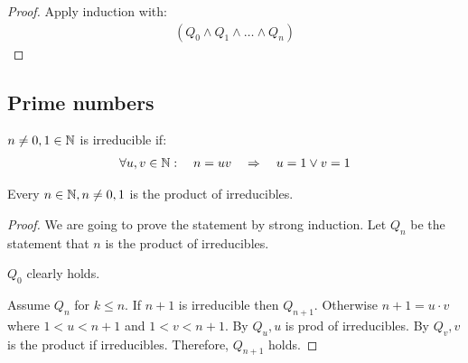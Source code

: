 \begin{proof}
Apply induction with:
\begin{align*}
(Q_0 \wedge Q_1 \wedge \dots \wedge Q_n)
\end{align*}
\end{proof}


\subsection{Prime numbers}
\begin{df}
$n \neq 0,1 \in \mathbb N$ is irreducible if:
\begin{align*}
\forall u,v \in \mathbb N: \quad n = uv \quad \Rightarrow \quad u=1 \vee v =1
\end{align*}
\end{df}
\begin{tm}
Every $n \in \mathbb N, n \neq 0,1$ is the product of irreducibles.
\end{tm}
\begin{proof}
We are going to prove the statement by strong induction.
Let $Q_n$ be the statement that $n$ is the product of irreducibles. 

$Q_0$ clearly holds. 

Assume $Q_n$ for $k \leq n$.
If $n+1$ is irreducible then $Q_{n+1}$.
Otherwise $n+1= u \cdot v$ where $1 < u < n+1$ and $1<v<n+1$.
By $Q_u, u$ is prod of irreducibles.
By $Q_v, v$ is the product if irreducibles. Therefore, $Q_{n+1}$ holds.
\end{proof}



